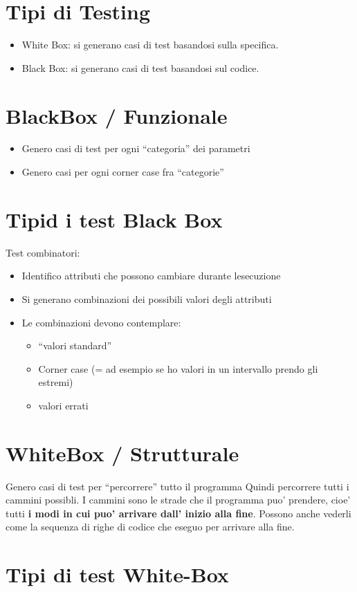 \documentclass[\main/main.tex]{subfiles}
\begin{document}
\section{Tipi di Testing}
\begin{itemize}
\item White Box: si generano casi di test basandosi sulla specifica.
\item Black Box: si generano casi di test basandosi sul codice.
\end{itemize}
\section{BlackBox / Funzionale}
\begin{itemize}
\item Genero casi di test per ogni ``categoria'' dei parametri
\item Genero casi per ogni corner case fra ``categorie''
\end{itemize}
\section{Tipid i test Black Box}
Test combinatori:
\begin{itemize}
\item Identifico attributi che possono cambiare durante lesecuzione
\item Si generano combinazioni dei possibili valori degli attributi
\item Le combinazioni devono contemplare:
\begin{itemize}
\item ``valori standard''
\item Corner case (= ad esempio se ho valori in un intervallo prendo gli estremi)
\item valori errati
\end{itemize}
\end{itemize}

\section{WhiteBox / Strutturale}
Genero casi di test per ``percorrere'' tutto il programma
Quindi percorrere tutti i cammini possibli.
I cammini sono le strade che il programma puo' prendere, cioe' tutti \textbf{i modi in cui puo' arrivare dall' inizio alla fine}.
Possono anche vederli come la sequenza di righe di codice che eseguo per arrivare alla fine.

\section{Tipi di test White-Box}
\end{document}
